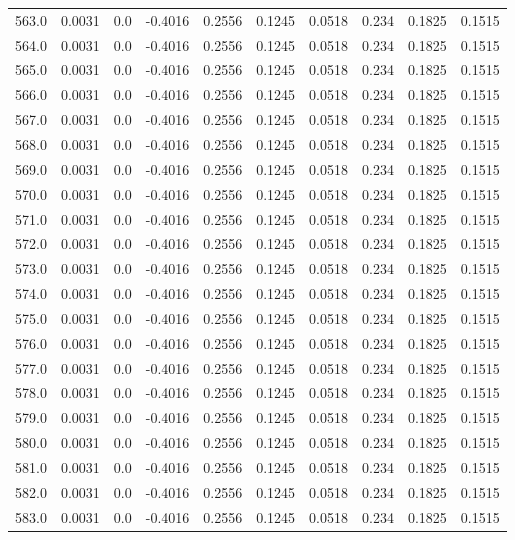 \begin{longtable}{lrrrrrrrrr}
563.0 & 0.0031 & 0.0 & -0.4016 & 0.2556 & 0.1245 & 0.0518 & 0.234 & 0.1825 & 0.1515 \\
564.0 & 0.0031 & 0.0 & -0.4016 & 0.2556 & 0.1245 & 0.0518 & 0.234 & 0.1825 & 0.1515 \\
565.0 & 0.0031 & 0.0 & -0.4016 & 0.2556 & 0.1245 & 0.0518 & 0.234 & 0.1825 & 0.1515 \\
566.0 & 0.0031 & 0.0 & -0.4016 & 0.2556 & 0.1245 & 0.0518 & 0.234 & 0.1825 & 0.1515 \\
567.0 & 0.0031 & 0.0 & -0.4016 & 0.2556 & 0.1245 & 0.0518 & 0.234 & 0.1825 & 0.1515 \\
568.0 & 0.0031 & 0.0 & -0.4016 & 0.2556 & 0.1245 & 0.0518 & 0.234 & 0.1825 & 0.1515 \\
569.0 & 0.0031 & 0.0 & -0.4016 & 0.2556 & 0.1245 & 0.0518 & 0.234 & 0.1825 & 0.1515 \\
570.0 & 0.0031 & 0.0 & -0.4016 & 0.2556 & 0.1245 & 0.0518 & 0.234 & 0.1825 & 0.1515 \\
571.0 & 0.0031 & 0.0 & -0.4016 & 0.2556 & 0.1245 & 0.0518 & 0.234 & 0.1825 & 0.1515 \\
572.0 & 0.0031 & 0.0 & -0.4016 & 0.2556 & 0.1245 & 0.0518 & 0.234 & 0.1825 & 0.1515 \\
573.0 & 0.0031 & 0.0 & -0.4016 & 0.2556 & 0.1245 & 0.0518 & 0.234 & 0.1825 & 0.1515 \\
574.0 & 0.0031 & 0.0 & -0.4016 & 0.2556 & 0.1245 & 0.0518 & 0.234 & 0.1825 & 0.1515 \\
575.0 & 0.0031 & 0.0 & -0.4016 & 0.2556 & 0.1245 & 0.0518 & 0.234 & 0.1825 & 0.1515 \\
576.0 & 0.0031 & 0.0 & -0.4016 & 0.2556 & 0.1245 & 0.0518 & 0.234 & 0.1825 & 0.1515 \\
577.0 & 0.0031 & 0.0 & -0.4016 & 0.2556 & 0.1245 & 0.0518 & 0.234 & 0.1825 & 0.1515 \\
578.0 & 0.0031 & 0.0 & -0.4016 & 0.2556 & 0.1245 & 0.0518 & 0.234 & 0.1825 & 0.1515 \\
579.0 & 0.0031 & 0.0 & -0.4016 & 0.2556 & 0.1245 & 0.0518 & 0.234 & 0.1825 & 0.1515 \\
580.0 & 0.0031 & 0.0 & -0.4016 & 0.2556 & 0.1245 & 0.0518 & 0.234 & 0.1825 & 0.1515 \\
581.0 & 0.0031 & 0.0 & -0.4016 & 0.2556 & 0.1245 & 0.0518 & 0.234 & 0.1825 & 0.1515 \\
582.0 & 0.0031 & 0.0 & -0.4016 & 0.2556 & 0.1245 & 0.0518 & 0.234 & 0.1825 & 0.1515 \\
583.0 & 0.0031 & 0.0 & -0.4016 & 0.2556 & 0.1245 & 0.0518 & 0.234 & 0.1825 & 0.1515 \\

\end{longtable}
